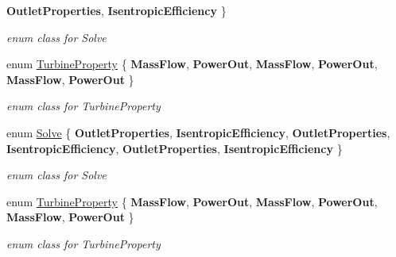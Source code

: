 \begin{DoxyCompactItemize}
{\bfseries Outlet\+Properties}, 
{\bfseries Isentropic\+Efficiency}
 \}\begin{DoxyCompactList}\small\item\em enum class for Solve \end{DoxyCompactList}
\item 
\mbox{\label{class_turbine_a5db4f65cf2539e3837684d53221ade12}} 
enum \hyperlink{class_turbine_a5db4f65cf2539e3837684d53221ade12}{Turbine\+Property} \{ \newline
{\bfseries Mass\+Flow}, 
{\bfseries Power\+Out}, 
{\bfseries Mass\+Flow}, 
{\bfseries Power\+Out}, 
\newline
{\bfseries Mass\+Flow}, 
{\bfseries Power\+Out}
 \}\begin{DoxyCompactList}\small\item\em enum class for Turbine\+Property \end{DoxyCompactList}
\item 
\mbox{\label{class_turbine_a9fd7beba6c6f071e228fbe3e07969d2b}} 
enum \hyperlink{class_turbine_a9fd7beba6c6f071e228fbe3e07969d2b}{Solve} \{ \newline
{\bfseries Outlet\+Properties}, 
{\bfseries Isentropic\+Efficiency}, 
{\bfseries Outlet\+Properties}, 
{\bfseries Isentropic\+Efficiency}, 
\newline
{\bfseries Outlet\+Properties}, 
{\bfseries Isentropic\+Efficiency}
 \}\begin{DoxyCompactList}\small\item\em enum class for Solve \end{DoxyCompactList}
\item 
\mbox{\label{class_turbine_a5db4f65cf2539e3837684d53221ade12}} 
enum \hyperlink{class_turbine_a5db4f65cf2539e3837684d53221ade12}{Turbine\+Property} \{ \newline
{\bfseries Mass\+Flow}, 
{\bfseries Power\+Out}, 
{\bfseries Mass\+Flow}, 
{\bfseries Power\+Out}, 
\newline
{\bfseries Mass\+Flow}, 
{\bfseries Power\+Out}
 \}\begin{DoxyCompactList}\small\item\em enum class for Turbine\+Property \end{DoxyCompactList}
\end{DoxyCompactItemize}

